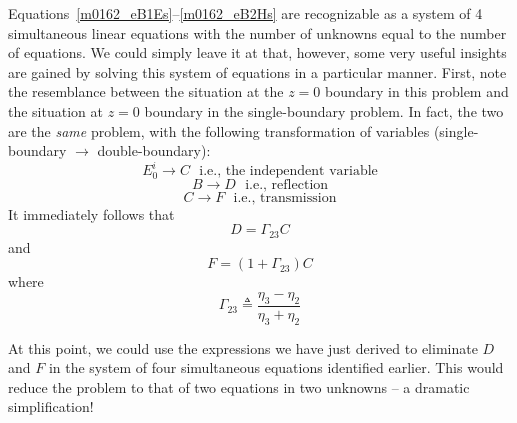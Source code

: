 Equations~\ref{m0162_eB1Es}--\ref{m0162_eB2Hs} are recognizable as a system of 4 simultaneous linear equations with the number of unknowns equal to the number of equations.  
We could simply leave it at that, however, some very useful insights are gained by solving this system of equations in a particular manner.
First, note the resemblance between the situation at the $z=0$ boundary in this problem and the situation at $z=0$ boundary in the single-boundary problem.  
In fact, the two are the {\it same} problem, with the following transformation of variables (single-boundary $\rightarrow$ double-boundary):
%
\begin{equation}
E_0^i \rightarrow C ~~~\mbox{i.e., the independent variable}
\end{equation}  
%
\begin{equation}
B \rightarrow D ~~~\mbox{i.e., reflection}
\end{equation} 
%
\begin{equation}
C \rightarrow F ~~~\mbox{i.e., transmission}
\end{equation} 
%
It immediately follows that 
%
\begin{equation}
D = \Gamma_{23} C 
\end{equation}
%
and
%
\begin{equation}
F = \left(1+\Gamma_{23}\right) C   
\end{equation}
%
where
%
\begin{equation}
\boxed{
\Gamma_{23}  \triangleq \frac{\eta_3-\eta_2}{\eta_3+\eta_2} 
}
\label{m0162_eGamma23}
\end{equation} 

At this point, we could use the expressions we have just derived to eliminate $D$ and $F$ in the system of four simultaneous equations identified earlier.
This would reduce the problem to that of two equations in two unknowns -- a dramatic simplification!  


